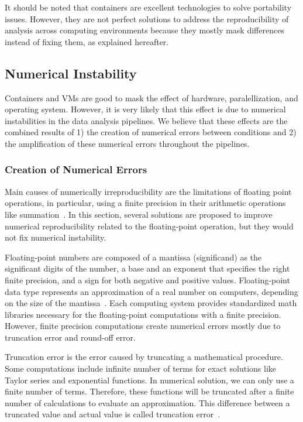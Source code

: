 It should be noted that containers are excellent technologies to solve 
portability issues. However, they are not perfect solutions to address 
the reproducibility of analysis across computing environments because 
they mostly mask differences instead of fixing them, as explained hereafter.

\subsection{Numerical Instability}

Containers and VMs are good to mask the effect of hardware, 
paralellization, and operating system. However, it is very likely that 
this effect is due to numerical instabilities in the data analysis 
pipelines. We believe that these effects are the combined results of 1) 
the creation of numerical errors between conditions and 2) the 
amplification of these numerical errors throughout the pipelines. 

\subsubsection{Creation of Numerical Errors}

Main causes of numerically irreproducibility are the limitations of 
floating point operations, in particular, using a finite precision in 
their arithmetic operations like summation~\cite{hill2017numerical, 
taufer2010improving}. In this section, several solutions are proposed 
to improve numerical reproducibility related to the floating-point 
operation, but they would not fix numerical instability. 

Floating-point numbers are composed of a mantissa (significand) as the 
significant digits of the number, a base and an exponent that specifies 
the right finite precision, and a sign for both negative and positive 
values. Floating-point data type represents an approximation of a real 
number on computers, depending on the size of the 
mantissa~\cite{hill2017numerical}. Each computing system provides 
standardized math libraries necessary for the floating-point 
computations with a finite precision. However, finite precision 
computations create numerical errors mostly due to truncation error and 
round-off error. 

Truncation error is the error caused by truncating a mathematical 
procedure. Some computations include infinite number of terms for exact 
solutions like Taylor series and exponential functions. 
In numerical 
solution, we can only use a finite number of terms. Therefore, these 
functions will be truncated after a finite number of calculations to 
evaluate an approximation. This difference between a truncated value 
and actual value is called truncation error~\cite{kiusalaas2013numerical}. 

